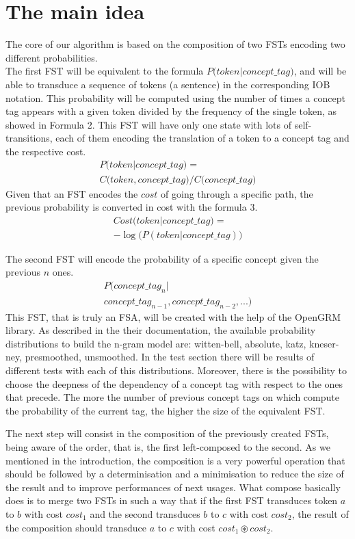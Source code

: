 \documentclass[11pt,a4paper]{article}
\begin{document}
\section{The main idea}

The core of our algorithm is based on the composition of two FSTs encoding two different probabilities.\\
The first FST will be equivalent to the formula $ P \big( token \big | concept\_tag ) $, and will be able to transduce a sequence of tokens (a sentence) in the corresponding IOB notation. This probability will be computed using the number of times a concept tag appears with a given token divided by the frequency of the single token, as showed in Formula 2. This FST will have only one state with lots of self-transitions, each of them encoding the translation of a token to a concept tag and the respective cost.
\begin{multline}
P \big( token | concept\_tag \big) = \\
C \big( token,concept\_tag \big) / C \big( concept\_tag \big)
\end{multline}
Given that an FST encodes the $cost$ of going through a specific path, the previous probability is converted in cost with the formula 3.
\begin{multline}
Cost \big( token | concept\_tag \big) = \\
- \log\big(P ( token | concept\_tag )\big)
\end{multline}

The second FST will encode the probability of a specific concept given the previous $n$ ones.
\begin{multline}
P \big( concept\_tag_n | \\
 concept\_tag_{n-1}, concept\_tag_{n-2}, ... \big)
\end{multline}
This FST, that is truly an FSA, will be created with the help of the OpenGRM library. As described in the their documentation, the available probability distributions to build the n-gram model are: witten-bell, absolute, katz, kneser-ney, presmoothed, unsmoothed. In the test section there will be results of different tests with each of this distributions. Moreover, there is the possibility to choose the deepness of the dependency of a concept tag with respect to the ones that precede. The more the number of previous concept tags on which compute the probability of the current tag, the higher the size of the equivalent FST.

The next step will consist in the composition of the previously created FSTs, being aware of the order, that is, the first left-composed to the second. As we mentioned in the introduction, the composition is a very powerful operation that should be followed by a determinisation and a minimisation to reduce the size of the result and to improve performances of next usages. What compose basically does is to merge two FSTs in such a way that if the first FST transduces token $a$ to $b$ with cost $cost_1$ and the second transduces $b$ to $c$ with cost $cost_2$, the result of the composition should transduce $a$ to $c$ with cost $ cost_1 \circledast cost_2 $.
\end{document}
